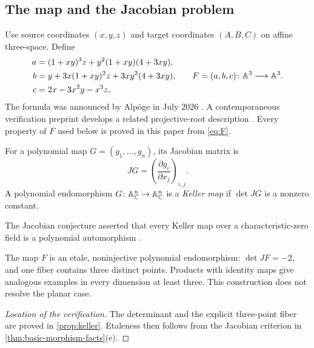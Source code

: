 \subsection{The map and the Jacobian problem}

\begin{construction}\label{con:polynomial-map}
Use source coordinates $(x,y,z)$ and target coordinates $(A,B,C)$ on affine three-space.  Define
\begin{equation}\label{eq:F}
\begin{aligned}
 a&=(1+xy)^3z+y^2(1+xy)(4+3xy),\\
 b&=y+3x(1+xy)^2z+3xy^2(4+3xy),\\
 c&=2x-3x^2y-x^3z,
\end{aligned}
\qquad
F=(a,b,c)\colon\mathbb A^3\longrightarrow\mathbb A^3.
\end{equation}
The formula was announced by Alp\"oge in July 2026 \cite{Alpoge2026}.  A contemporaneous verification preprint develops a related projective-root description \cite{Verification2026}.  Every property of $F$ used below is proved in this paper from \eqref{eq:F}.
\end{construction}

\begin{definition}\label{def:keller-map}
For a polynomial map $G=(g_1,\ldots,g_n)$, its Jacobian matrix is
\[
  JG=\left(\frac{\partial g_i}{\partial x_j}\right)_{i,j}.
\]
A polynomial endomorphism $G\colon\mathbb A^n_{\mathbb C}\to\mathbb A^n_{\mathbb C}$ is a \emph{Keller map} if $\det JG$ is a nonzero constant.
\end{definition}

\begin{problem}\label{prob:jacobian-conjecture}
The Jacobian conjecture asserted that every Keller map over a characteristic-zero field is a polynomial automorphism \cite{Keller1939,BCW1982,vanDenEssen2000}.
\end{problem}

\begin{observation}\label{obs:F-jacobian-outcome}
The map $F$ is an etale, noninjective polynomial endomorphism: $\det JF=-2$, and one fiber contains three distinct points.  Products with identity maps give analogous examples in every dimension at least three.  This construction does not resolve the planar case.
\end{observation}

\begin{proof}[Location of the verification]
The determinant and the explicit three-point fiber are proved in \cref{prop:keller}.  Etaleness then follows from the Jacobian criterion in \cref{thm:basic-morphism-facts}(e).
\end{proof}


